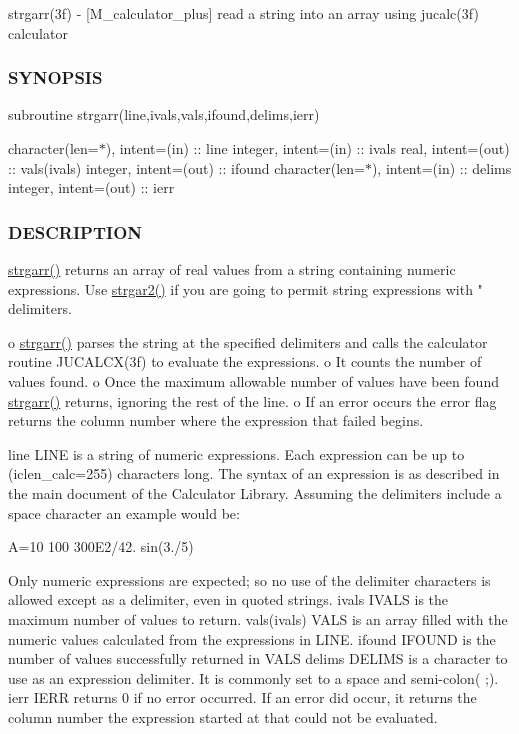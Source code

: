 strgarr(3f) -\/ \mbox{[}M\+\_\+calculator\+\_\+plus\mbox{]} read a string into an array using jucalc(3f) calculator \subsubsection*{S\+Y\+N\+O\+P\+S\+IS}

subroutine strgarr(line,ivals,vals,ifound,delims,ierr)

character(len=$\ast$), intent=(in) \+:\+: line integer, intent=(in) \+:\+: ivals real, intent=(out) \+:\+: vals(ivals) integer, intent=(out) \+:\+: ifound character(len=$\ast$), intent=(in) \+:\+: delims integer, intent=(out) \+:\+: ierr

\subsubsection*{D\+E\+S\+C\+R\+I\+P\+T\+I\+ON}

\hyperlink{namespacem__calculator__plus_a4d3424e0cb74d4af53e7f59c07d31f1b}{strgarr()} returns an array of real values from a string containing numeric expressions. Use \hyperlink{namespacem__calculator__plus_a59710eb6babeed1f4b8d439f97d5d90a}{strgar2()} if you are going to permit string expressions with " delimiters.

o \hyperlink{namespacem__calculator__plus_a4d3424e0cb74d4af53e7f59c07d31f1b}{strgarr()} parses the string at the specified delimiters and calls the calculator routine J\+U\+C\+A\+L\+C\+X(3f) to evaluate the expressions. o It counts the number of values found. o Once the maximum allowable number of values have been found \hyperlink{namespacem__calculator__plus_a4d3424e0cb74d4af53e7f59c07d31f1b}{strgarr()} returns, ignoring the rest of the line. o If an error occurs the error flag returns the column number where the expression that failed begins.

line L\+I\+NE is a string of numeric expressions. Each expression can be up to (iclen\+\_\+calc=255) characters long. The syntax of an expression is as described in the main document of the Calculator Library. Assuming the delimiters include a space character an example would be\+:

\textquotesingle{}A=10 100 300\+E2/42. sin(3./5)\textquotesingle{}

Only numeric expressions are expected; so no use of the delimiter characters is allowed except as a delimiter, even in quoted strings. ivals I\+V\+A\+LS is the maximum number of values to return. vals(ivals) V\+A\+LS is an array filled with the numeric values calculated from the expressions in L\+I\+NE. ifound I\+F\+O\+U\+ND is the number of values successfully returned in V\+A\+LS delims D\+E\+L\+I\+MS is a character to use as an expression delimiter. It is commonly set to a space and semi-\/colon(\textquotesingle{} ;\textquotesingle{}). ierr I\+E\+RR returns 0 if no error occurred. If an error did occur, it returns the column number the expression started at that could not be evaluated.


